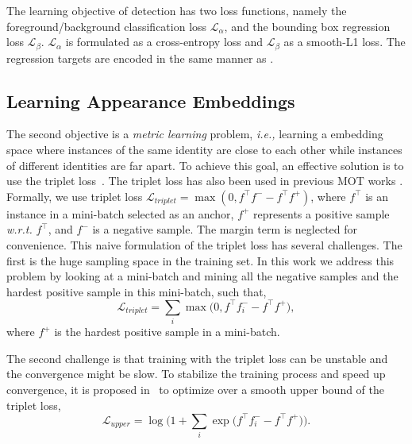 \documentclass[runningheads]{llncs}
\def\wrt{\textit{w.r.t. }}
\begin{document}
The learning objective of detection has two loss functions, namely the foreground/background classification loss $\mathcal{L}_\alpha$, and the bounding box regression loss $\mathcal{L}_\beta$.  $\mathcal{L}_\alpha$ is formulated as a cross-entropy loss and $\mathcal{L}_\beta$ as a smooth-L1 loss. The regression targets are encoded in the same manner as \cite{faster}.

\subsection{Learning Appearance Embeddings}
The second objective is a \emph{metric learning} problem, \emph{i.e.,} learning a embedding space where instances of the same identity are close to each other while instances of different identities are far apart.
To achieve this goal, an effective solution is to use the triplet loss~\cite{triplet}. The triplet loss has also been used in previous MOT works \cite{MOTS}. Formally, we use triplet loss
$\mathcal{L}_{triplet} = \max (0, f^{\top}f^{-} - f^{\top}f^{+})$,
where $f^{\top}$ is an instance in a mini-batch selected as an anchor, $f^{+}$ represents a positive sample \wrt $f^{\top}$, and $f^{-}$ is a negative sample. The margin term is neglected for convenience.
This naive formulation of the triplet loss has several challenges. The first is the huge sampling space in the training set. In this work we address this problem by looking at a mini-batch and mining all the negative samples and the hardest positive sample in this mini-batch, such that,
\begin{equation}
   \mathcal{L}_{triplet} = \sum_i \max \big(0, f^{\top}f^{-}_i - f^{\top}f^{+}\big),
\end{equation}
where $f^{+}$ is the hardest positive sample in a mini-batch.

The second challenge is that training with the triplet loss can be unstable and the convergence might be slow. To stabilize the training process and speed up convergence, it is proposed in~\cite{npair} to optimize over a smooth upper bound of the triplet loss,
\begin{equation}
    \mathcal{L}_{upper} = \log \Big(1+ \sum_i   \exp \big(f^{\top}f^{-}_i - f^{\top}f^{+}\big)\Big).
\end{equation}
\end{document}
